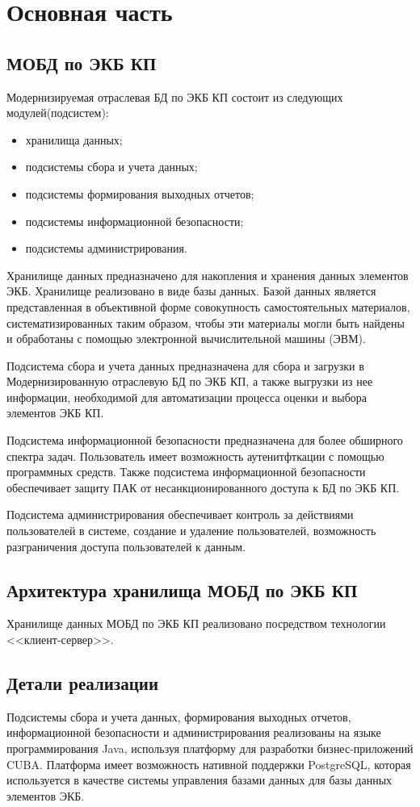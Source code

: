 \chapter{Основная часть}
\section{МОБД по ЭКБ КП}
Модернизируемая отраслевая БД по ЭКБ КП состоит из следующих модулей(подсистем):
\begin{itemize}
	\item хранилища данных;
	\item подсистемы сбора и учета данных;
	\item подсистемы формирования выходных отчетов;
	\item подсистемы информационной безопасности;
	\item подсистемы администрирования.
\end{itemize}
Хранилище данных предназначено для накопления и хранения данных элементов ЭКБ. Хранилище реализовано в виде базы данных. Базой данных является представленная в объективной форме совокупность самостоятельных материалов, систематизированных таким образом, чтобы эти материалы могли быть найдены и обработаны с помощью электронной вычислительной машины (ЭВМ). \cite{bd}

Подсистема сбора и учета данных предназначена для сбора и загрузки в Модернизированную отраслевую БД по ЭКБ КП, а также выгрузки из нее информации, необходимой для автоматизации процесса оценки и выбора элементов ЭКБ КП. 

Подсистема информационной безопасности предназначена для более обширного спектра задач. Пользователь имеет возможность аутенитфткации с помощью программных средств. Также подсистема информационной безопасности обеспечивает защиту ПАК от несанкционированного доступа к БД по ЭКБ КП.

Подсистема администрирования обеспечивает контроль за действиями пользователей в системе, создание и удаление пользователей, возможность разграничения доступа  пользователей к данным.

\section{Архитектура хранилища МОБД по ЭКБ КП}
Хранилище данных МОБД по ЭКБ КП реализовано посредством технологии <<клиент-сервер>>.

\section{Детали реализации}
Подсистемы сбора и учета данных, формирования выходных отчетов, информационной безопасности и администрирования реализованы на языке программирования Java, используя платформу для разработки бизнес-приложений CUBA. \cite{cuba} 
Платформа имеет возможность нативной поддержки PostgreSQL, \cite{psql} которая используется в качестве системы управления базами данных для базы данных элементов ЭКБ.

